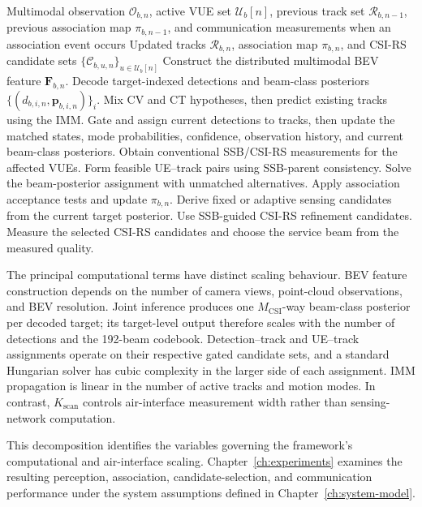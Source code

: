 \begin{algorithm}[t]
\caption{Measurement-assisted sensing beam management at target BS \(b\)}
\label{alg:method-framework}
\begin{algorithmic}[1]
\REQUIRE Multimodal observation \(\mathcal{O}_{b,n}\), active VUE set
\(\mathcal{U}_b[n]\), previous track set \(\mathcal{R}_{b,n-1}\), previous
association map \(\pi_{b,n-1}\), and communication measurements when an
association event occurs
\ENSURE Updated tracks \(\mathcal{R}_{b,n}\), association map \(\pi_{b,n}\), and
CSI-RS candidate sets \(\{\mathcal{C}_{b,u,n}\}_{u\in\mathcal{U}_b[n]}\)
\STATE Construct the distributed multimodal BEV feature \(\mathbf{F}_{b,n}\).
\STATE Decode target-indexed detections and beam-class posteriors
\(\{(d_{b,i,n},\mathbf{p}_{b,i,n})\}_i\).
    \STATE Mix CV and CT hypotheses, then predict existing tracks using the IMM.
    \STATE Gate and assign current detections to tracks, then update the matched
    states, mode probabilities, confidence, observation history, and current
    beam-class posteriors.
    \STATE Obtain conventional SSB/CSI-RS measurements for the affected VUEs.
    \STATE Form feasible UE--track pairs using SSB-parent consistency.
    \STATE Solve the beam-posterior assignment with unmatched alternatives.
    \STATE Apply association acceptance tests and update \(\pi_{b,n}\).
\ENDIF
{}
        \STATE Derive fixed or adaptive sensing candidates from the current
        target posterior.
    \ELSE
        \STATE Use SSB-guided CSI-RS refinement candidates.
    \ENDIF
    \STATE Measure the selected CSI-RS candidates and choose the service beam
    from the measured quality.
\ENDFOR
\end{algorithmic}
\end{algorithm}

The principal computational terms have distinct scaling behaviour.  BEV feature
construction depends on the number of camera views, point-cloud observations,
and BEV resolution.  Joint inference produces one \(M_{\mathrm{CSI}}\)-way
beam-class posterior per decoded target; its target-level output therefore scales with
the number of detections and the 192-beam codebook.  Detection--track and
UE--track assignments operate on their respective gated candidate sets, and a
standard Hungarian solver has cubic complexity in the larger side of each
assignment.  IMM propagation is linear in the number of active tracks and
motion modes.  In contrast, \(K_{\mathrm{scan}}\) controls air-interface
measurement width rather than sensing-network computation.

This decomposition identifies the variables governing the framework's
computational and air-interface scaling.  Chapter~\ref{ch:experiments} examines
the resulting perception, association, candidate-selection, and communication
performance under the system assumptions defined in Chapter~\ref{ch:system-model}.
